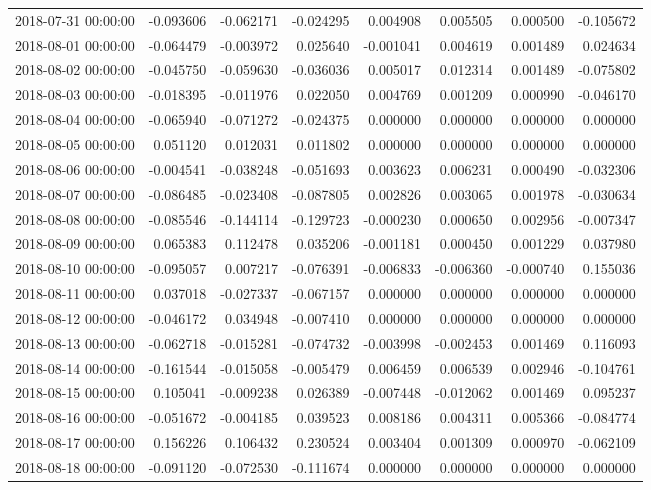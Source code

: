 \begin{tabular}{lrrrrrrr}
2018-07-31 00:00:00 & -0.093606 & -0.062171 & -0.024295 & 0.004908 & 0.005505 & 0.000500 & -0.105672 \\
2018-08-01 00:00:00 & -0.064479 & -0.003972 & 0.025640 & -0.001041 & 0.004619 & 0.001489 & 0.024634 \\
2018-08-02 00:00:00 & -0.045750 & -0.059630 & -0.036036 & 0.005017 & 0.012314 & 0.001489 & -0.075802 \\
2018-08-03 00:00:00 & -0.018395 & -0.011976 & 0.022050 & 0.004769 & 0.001209 & 0.000990 & -0.046170 \\
2018-08-04 00:00:00 & -0.065940 & -0.071272 & -0.024375 & 0.000000 & 0.000000 & 0.000000 & 0.000000 \\
2018-08-05 00:00:00 & 0.051120 & 0.012031 & 0.011802 & 0.000000 & 0.000000 & 0.000000 & 0.000000 \\
2018-08-06 00:00:00 & -0.004541 & -0.038248 & -0.051693 & 0.003623 & 0.006231 & 0.000490 & -0.032306 \\
2018-08-07 00:00:00 & -0.086485 & -0.023408 & -0.087805 & 0.002826 & 0.003065 & 0.001978 & -0.030634 \\
2018-08-08 00:00:00 & -0.085546 & -0.144114 & -0.129723 & -0.000230 & 0.000650 & 0.002956 & -0.007347 \\
2018-08-09 00:00:00 & 0.065383 & 0.112478 & 0.035206 & -0.001181 & 0.000450 & 0.001229 & 0.037980 \\
2018-08-10 00:00:00 & -0.095057 & 0.007217 & -0.076391 & -0.006833 & -0.006360 & -0.000740 & 0.155036 \\
2018-08-11 00:00:00 & 0.037018 & -0.027337 & -0.067157 & 0.000000 & 0.000000 & 0.000000 & 0.000000 \\
2018-08-12 00:00:00 & -0.046172 & 0.034948 & -0.007410 & 0.000000 & 0.000000 & 0.000000 & 0.000000 \\
2018-08-13 00:00:00 & -0.062718 & -0.015281 & -0.074732 & -0.003998 & -0.002453 & 0.001469 & 0.116093 \\
2018-08-14 00:00:00 & -0.161544 & -0.015058 & -0.005479 & 0.006459 & 0.006539 & 0.002946 & -0.104761 \\
2018-08-15 00:00:00 & 0.105041 & -0.009238 & 0.026389 & -0.007448 & -0.012062 & 0.001469 & 0.095237 \\
2018-08-16 00:00:00 & -0.051672 & -0.004185 & 0.039523 & 0.008186 & 0.004311 & 0.005366 & -0.084774 \\
2018-08-17 00:00:00 & 0.156226 & 0.106432 & 0.230524 & 0.003404 & 0.001309 & 0.000970 & -0.062109 \\
2018-08-18 00:00:00 & -0.091120 & -0.072530 & -0.111674 & 0.000000 & 0.000000 & 0.000000 & 0.000000 \\

\end{tabular}
